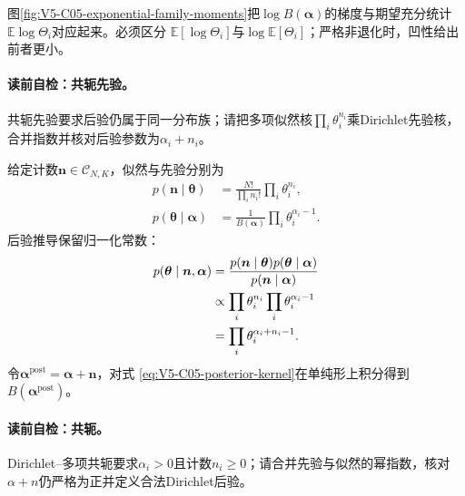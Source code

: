 图\ref{fig:V5-C05-exponential-family-moments}把$\log B(\boldsymbol\alpha)$的梯度与期望充分统计$\mathbb E\log\Theta_i$对应起来。必须区分
$\mathbb E[\log\Theta_i]$与$\log\mathbb E[\Theta_i]$；严格非退化时，凹性给出前者更小。


\paragraph{读前自检：共轭先验。}共轭先验要求后验仍属于同一分布族；请把多项似然核$\prod_i\theta_i^{n_i}$乘Dirichlet先验核，合并指数并核对后验参数为$\alpha_i+n_i$。\par


给定计数$\boldsymbol n\in\mathcal C_{N,K}$，似然与先验分别为
\begin{align}
p(\boldsymbol n\mid\boldsymbol\theta)
&=\frac{N!}{\prod_i n_i!}\prod_i\theta_i^{n_i},
\label{eq:V5-C05-count-likelihood}\\
p(\boldsymbol\theta\mid\boldsymbol\alpha)
&=\frac1{B(\boldsymbol\alpha)}
\prod_i\theta_i^{\alpha_i-1}.
\label{eq:V5-C05-dirichlet-prior}
\end{align}
后验推导保留归一化常数：
\begin{align}
p(\boldsymbol\theta\mid\boldsymbol n,\boldsymbol\alpha)
&=\frac{
p(\boldsymbol n\mid\boldsymbol\theta)
p(\boldsymbol\theta\mid\boldsymbol\alpha)}
{p(\boldsymbol n\mid\boldsymbol\alpha)}\notag\\
&\propto
\prod_i\theta_i^{n_i}
\prod_i\theta_i^{\alpha_i-1}\notag\\
&=\prod_i\theta_i^{\alpha_i+n_i-1}.
\label{eq:V5-C05-posterior-kernel}
\end{align}
令$\boldsymbol\alpha^{\mathrm{post}}=\boldsymbol\alpha+\boldsymbol n$，对式
\eqref{eq:V5-C05-posterior-kernel}在单纯形上积分得到$B(\boldsymbol\alpha^{\mathrm{post}})$。

\paragraph{读前自检：共轭。}Dirichlet--多项共轭要求$\alpha_i>0$且计数$n_i\ge0$；请合并先验与似然的幂指数，核对$\alpha+n$仍严格为正并定义合法Dirichlet后验。\par

